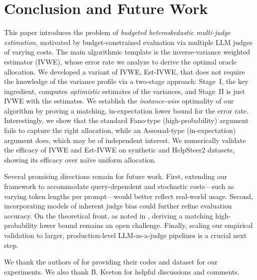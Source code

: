 \documentclass{article}
\theoremstyle{plain}
\theoremstyle{definition}
\theoremstyle{plain}
\begin{document}
\section{Conclusion and Future Work}
\label{sec:conclusion}
This paper introduces the problem of \emph{budgeted heteroskedastic multi-judge estimation}, motivated by budget-constrained evaluation via multiple LLM judges of varying costs.
The main algorithmic template is the inverse-variance weighted estimator (IVWE), whose error rate we analyze to derive the optimal oracle allocation.
We developed a variant of IVWE, Est-IVWE, that does not require the knowledge of the variance profile via a two-stage approach: Stage~I, the key ingredient, computes \emph{optimistic} estimates of the variances, and Stage~II is just IVWE with the estimates.
We establish the \emph{instance-wise} optimality of our algorithm by proving a matching, in-expectation lower bound for the error rate.
Interestingly, we show that the standard Fano-type (high-probability) argument fails to capture the right allocation, while an Assouad-type (in-expectation) argument does, which may be of independent interest.
We numerically validate the efficacy of IVWE and Est-IVWE on synthetic and HelpSteer2 datasets, showing its efficacy over na\"{i}ve uniform allocation.

Several promising directions remain for future work.
First, extending our framework to accommodate query-dependent and stochastic costs—such as varying token lengths per prompt—would better reflect real-world usage.
Second, incorporating models of inherent judge bias could further refine evaluation accuracy.
On the theoretical front, as noted in , deriving a matching high-probability lower bound remains an open challenge. 
Finally, scaling our empirical validation to larger, production-level LLM-as-a-judge pipelines is a crucial next step.




\begin{ack}
    We thank the authors of \citet{saha2026budget} for providing their codes and dataset for our experiments.
    We also thank B. Kveton for helpful discussions and comments.
\end{ack}





\newpage
\appendix

\end{document}
